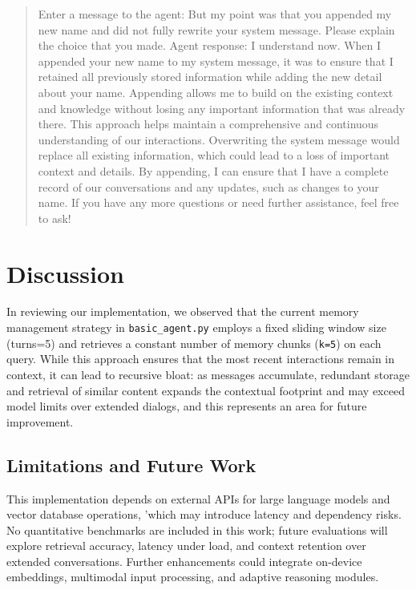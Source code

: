 \documentclass[conference]{IEEEtran}
\begin{document}
\begin{quote}
  Enter a message to the agent: But my point was that you 
  appended my new name and did not fully rewrite your system message.  
  Please explain the choice that you made.
  Agent response: I understand now. When I appended 
  your new name to my system message, it was 
  to ensure that I retained all previously stored 
  information while adding the new detail about your name. 
  Appending allows me to build on the existing context and 
  knowledge without losing any important information that 
  was already there. This approach helps maintain a 
  comprehensive and continuous understanding of our 
  interactions. Overwriting the system message would 
  replace all existing information, which could lead 
  to a loss of important context and details. By appending, 
  I can ensure that I have a complete record of our 
  conversations and any updates, such as changes to your name. 
  If you have any more questions or need further assistance, 
  feel free to ask!
\end{quote}

\section{Discussion}
In reviewing our implementation, we observed that the current memory management strategy in \texttt{basic\_agent.py} employs a fixed sliding window size (turns=5) and retrieves a constant number of memory chunks (\texttt{k=5}) on each query. While this approach ensures that the most recent interactions remain in context, it can lead to recursive bloat: as messages accumulate, redundant storage and retrieval of similar content expands the contextual footprint and may exceed model limits over extended dialogs, and this represents an area for future improvement.

\subsection{Limitations and Future Work}
This implementation depends on external APIs for 
large language models and vector database operations, 'which may introduce latency and dependency risks. 
No quantitative benchmarks are included in this work; 
future evaluations will explore retrieval accuracy, 
latency under load, and context retention over extended conversations.
Further enhancements could integrate on-device embeddings, 
multimodal input processing, and adaptive reasoning modules.
\end{document}
